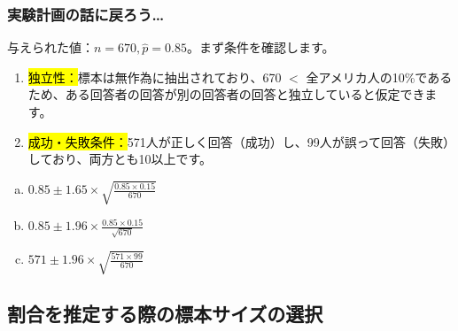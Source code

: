 
\begin{frame}
\frametitle{実験計画の話に戻ろう…}


与えられた値：$n = 670, \hat{p} = 0.85$。まず条件を確認します。

\begin{enumerate}[1.]
\item \hl{独立性：}標本は無作為に抽出されており、670 $<$ 全アメリカ人の10\%であるため、ある回答者の回答が別の回答者の回答と独立していると仮定できます。
\item \hl{成功・失敗条件：}571人が正しく回答（成功）し、99人が誤って回答（失敗）しており、両方とも10以上です。
\end{enumerate}

\end{frame}


\begin{frame}


\begin{enumerate}[(a)]
 
\item $0.85 \pm 1.65 \times \sqrt{\frac{0.85 \times 0.15}{670}}$
\item $0.85 \pm 1.96 \times \frac{0.85 \times 0.15}{\sqrt{670}}$
\item $571 \pm 1.96 \times \sqrt{\frac{571 \times 99}{670}}$
\end{enumerate}

\end{frame}



\subsection{割合を推定する際の標本サイズの選択}


